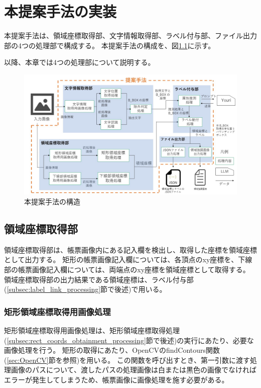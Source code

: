 \chapter{本提案手法の実装}\label{cha:Implementation}
本提案手法は、領域座標取得部、文字情報取得部、ラベル付与部、ファイル出力部の4つの処理部で構成する。
本提案手法の構成を、図\ref{fig:structure}に示す。

以降、本章では4つの処理部について説明する。

\begin{figure}[t]
    \begin{center}
        \includegraphics[width=15cm]{image/04-implementation/structure.jpg}
        \caption{本提案手法の構造}
        \label{fig:structure}
    \end{center}
\end{figure}


\section{領域座標取得部}\label{sec:area_coords_obtainment_part}
領域座標取得部は、帳票画像内にある記入欄を検出し、取得した座標を領域座標として出力する。
矩形の帳票画像記入欄については、各頂点のxy座標を、下線部の帳票画像記入欄については、両端点のxy座標を領域座標として取得する。
領域座標取得部の出力結果である領域座標は、ラベル付与部(\ref{subsec:label_link_processing}節で後述)で用いる。

\subsection{矩形領域座標取得用画像処理}\label{subsec:image_processing_for_rect_coords_obtainment}
矩形領域座標取得用画像処理は、矩形領域座標取得処理(\ref{subsec:rect_coords_obtainment_processing}節で後述)の実行にあたり、必要な画像処理を行う。
矩形の取得にあたり、OpenCVのfindContours関数(\ref{sec:OpenCV}節を参照)を用いる。
この関数を呼び出すとき、第一引数に渡す処理画像のパスについて、渡したパスの処理画像は白または黒色の画像でなければエラーが発生してしまうため、帳票画像に画像処理を施す必要がある。

